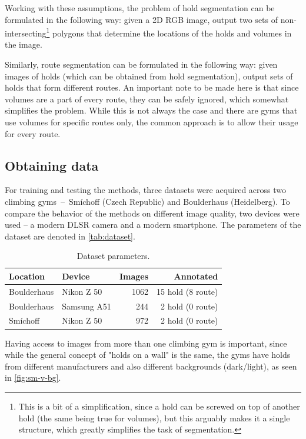\documentclass[final]{cvpr}
\begin{document}
Working with these assumptions, the problem of hold segmentation can be formulated in the following way: given a 2D RGB image, output two sets of non-intersecting\footnote{This is a bit of a simplification, since a hold can be screwed on top of another hold (the same being true for volumes), but this arguably makes it a single structure, which greatly simplifies the task of segmentation.} polygons that determine the locations of the holds and volumes in the image.

Similarly, route segmentation can be formulated in the following way: given images of holds (which can be obtained from hold segmentation), output sets of holds that form different routes.
An important note to be made here is that since volumes are a part of every route, they can be safely ignored, which somewhat simplifies the problem.
While this is not always the case and there are gyms that use volumes for specific routes only, the common approach is to allow their usage for every route. 


\subsection{Obtaining data}\label{sec:obtaining_data}  %
For training and testing the methods, three datasets were acquired across two climbing gyms~--~Smíchoff (Czech Republic) and Boulderhaus (Heidelberg).
To compare the behavior of the methods on different image quality, two devices were used -- a modern DLSR camera and a modern smartphone. The parameters of the dataset are denoted in \autoref{tab:dataset}.

\begin{table}[h]
\centering
\begin{tabular}{@{}llrr@{}}
\toprule
Location & Device & Images & Annotated \\ \midrule
Boulderhaus       & Nikon Z 50         & 1062           & 15 hold (8 route)           \\
Boulderhaus       & Samsung A51 & 244            & 2 hold (0 route)           \\
Smíchoff          & Nikon Z 50         & 972            & 2 hold (0 route)           \\ \bottomrule
\end{tabular}
\caption{Dataset parameters.}
\label{tab:dataset}
\end{table}

Having access to images from more than one climbing gym is important, since while the general concept of "holds on a wall" is the same, the gyms have holds from different manufacturers and also different backgrounds (dark/light), as seen in \autoref{fig:sm-v-bg}.
\end{document}
